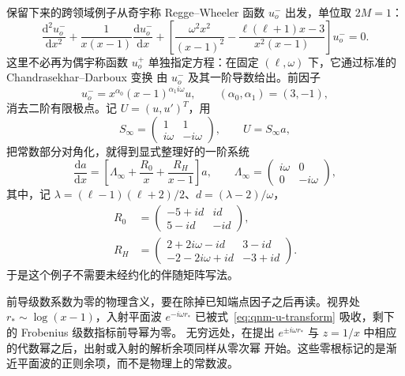 \documentclass[11pt,a4paper]{ctexart}
\newcommand{\dd}{\mathrm d}
\renewcommand{\_}{\origunderscore\allowbreak}
\begin{document}
保留下来的跨领域例子从奇宇称 Regge--Wheeler 函数 $u^-_o$ 出发，单位取 $2M=1$：
\begin{equation}
 \frac{\dd^2u^-_o}{\dd x^2}
 +\frac{1}{x(x-1)}\frac{\dd u^-_o}{\dd x}
 +\left[\frac{\omega^2x^2}{(x-1)^2}
 -\frac{\ell(\ell+1)x-3}{x^2(x-1)}\right]u^-_o=0.
 \label{eq:qnm-original-rw}
\end{equation}
这里不必再为偶宇称函数 $u^+_o$ 单独指定方程：在固定 $(\ell,\omega)$ 下，它通过标准的
Chandrasekhar--Darboux 变换 \cite{Glampedakis:2017rar} 由 $u^-_o$ 及其一阶导数给出。前因子
\begin{equation}
 u^-_o=x^{\alpha_0}(x-1)^{\alpha_1 i\omega}u,
 \qquad (\alpha_0,\alpha_1)=(3,-1),
 \label{eq:qnm-u-transform}
\end{equation}
消去二阶有限极点。记 $U=(u,u')^T$，用
\begin{equation}
 S_\infty=\begin{pmatrix}1&1\\ i\omega&-i\omega\end{pmatrix},
 \qquad U=S_\infty a,
\end{equation}
把常数部分对角化，就得到显式整理好的一阶系统
\begin{equation}
 \frac{\dd a}{\dd x}=\left[\Lambda_\infty+
 \frac{R_0}{x}+\frac{R_H}{x-1}\right]a,
 \qquad \Lambda_\infty=\begin{pmatrix}i\omega&0\\0&-i\omega\end{pmatrix},
 \label{eq:qnm-diagonal-system}
\end{equation}
其中，记 $\lambda=(\ell-1)(\ell+2)/2$、$d=(\lambda-2)/\omega$，
\begin{align}
 R_0&=\begin{pmatrix}-5+id&id\\5-id&-id\end{pmatrix},\\
 R_H&=\begin{pmatrix}2+2i\omega-id&3-id\\-2-2i\omega+id&-3+id\end{pmatrix}.
 \label{eq:qnm-residue-matrices}
\end{align}
于是这个例子不需要未经约化的伴随矩阵写法。

前导级数系数为零的物理含义，要在除掉已知端点因子之后再读。视界处 $r_*\sim\log(x-1)$，入射平面波
$e^{-i\omega r_*}$ 已被式~\eqref{eq:qnm-u-transform} 吸收，剩下的 Frobenius 级数指标前导幂为零。
无穷远处，在提出 $e^{\pm i\omega r_*}$ 与 $z=1/x$ 中相应的代数幂之后，出射或入射的解析余项同样从零次幂
开始。这些零根标记的是渐近平面波的正则余项，而不是物理上的常数波。
\end{document}
